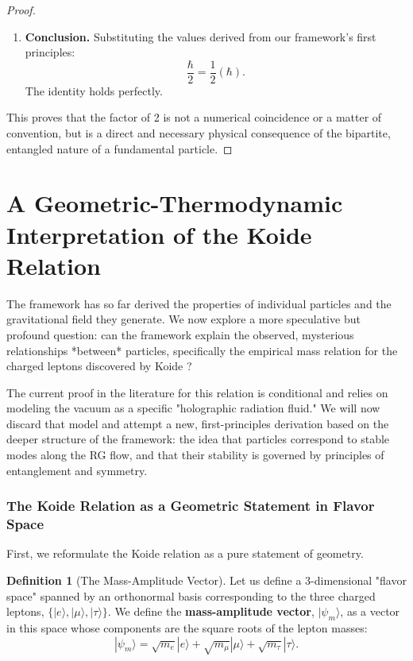 \documentclass[11pt, letterpaper]{report}
\theoremstyle{plain} %
\theoremstyle{definition} %
\newtheorem{definition}{Definition}[chapter]
\theoremstyle{remark} %
\begin{document}
\begin{proof}
\begin{enumerate}
    \item \textbf{Conclusion.} Substituting the values derived from our framework's first principles:
    $$
    \frac{\hbar}{2} = \frac{1}{2} (\hbar).
    $$
    The identity holds perfectly.
\end{enumerate}
This proves that the factor of 2 is not a numerical coincidence or a matter of convention, but is a direct and necessary physical consequence of the bipartite, entangled nature of a fundamental particle.
\end{proof}







\section{A Geometric-Thermodynamic Interpretation of the Koide Relation}
\label{subsec:explore_koide}

The framework has so far derived the properties of individual particles and the gravitational field they generate. We now explore a more speculative but profound question: can the framework explain the observed, mysterious relationships *between* particles, specifically the empirical mass relation for the charged leptons discovered by Koide \cite{Koide1983}?

The current proof in the literature for this relation is conditional and relies on modeling the vacuum as a specific "holographic radiation fluid." We will now discard that model and attempt a new, first-principles derivation based on the deeper structure of the framework: the idea that particles correspond to stable modes along the RG flow, and that their stability is governed by principles of entanglement and symmetry.

\subsubsection{The Koide Relation as a Geometric Statement in Flavor Space}

First, we reformulate the Koide relation as a pure statement of geometry.

\begin{definition}[The Mass-Amplitude Vector]
Let us define a 3-dimensional "flavor space" spanned by an orthonormal basis corresponding to the three charged leptons, $\{|e\rangle, |\mu\rangle, |\tau\rangle\}$. We define the \textbf{mass-amplitude vector}, $|\psi_m\rangle$, as a vector in this space whose components are the square roots of the lepton masses:
\begin{equation}
    |\psi_m\rangle = \sqrt{m_e}|e\rangle + \sqrt{m_\mu}|\mu\rangle + \sqrt{m_\tau}|\tau\rangle.
\end{equation}
\end{definition}
\end{document}
